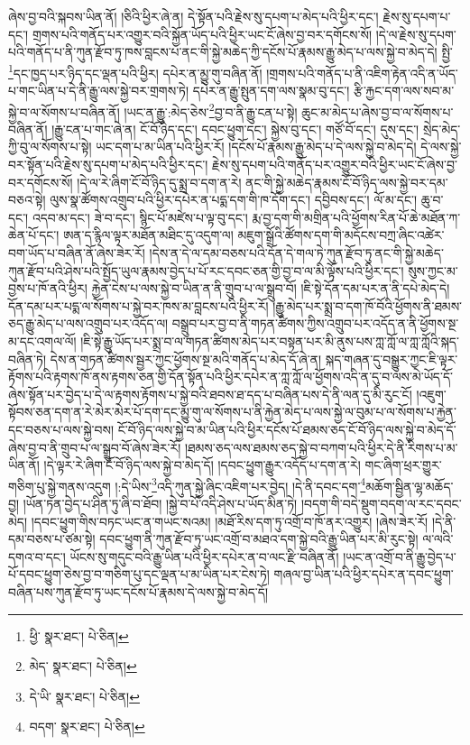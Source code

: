 ཞེས་བྱ་བའི་སྐབས་ཡིན་ནོ། །ཅིའི་ཕྱིར་ཞེ་ན། དེ་སྟོན་པའི་རྗེས་སུ་དཔག་པ་མེད་པའི་ཕྱིར་དང་། རྗེས་སུ་དཔག་པ་དང་། གྲགས་པའི་གནོད་པར་འགྱུར་བའི་སྐྱོན་ཡོད་པའི་ཕྱིར་ཡང་ངོ་ཞེས་བྱ་བར་དགོངས་སོ། །དེ་ལ་རྗེས་སུ་དཔག་པའི་གནོད་པ་ནི་ཀུན་རྫོབ་ཏུ་ཁས་བླངས་པ་ནང་གི་སྐྱེ་མཆེད་ཀྱི་དངོས་པོ་རྣམས་རྒྱུ་མེད་པ་ལས་སྐྱེ་བ་མེད་དེ། སྤྱི་\footnote{ཕྱི་  སྣར་ཐང་།  པེ་ཅིན། }དང་ཁྱད་པར་ཉིད་དང་ལྡན་པའི་ཕྱིར། དཔེར་ན་མྱུ་གུ་བཞིན་ནོ། །གྲགས་པའི་གནོད་པ་ནི་འཇིག་རྟེན་འདི་ན་ཡོད་པ་གང་ཡིན་པ་དེ་ནི་རྒྱུ་ལས་སྐྱེ་བར་གྲགས་ཏེ། དཔེར་ན་རྒྱུ་སྤུན་དག་ལས་སྣམ་བུ་དང་། རྩི་རྐྱང་དག་ལས་སབ་མ་སྐྱེ་བ་ལ་སོགས་པ་བཞིན་ནོ། །ཡང་ན་རྒྱུ་:མེད་ཅེས་\footnote{མེད་  སྣར་ཐང་།  པེ་ཅིན། }བྱ་བ་ནི་རྒྱུ་ངན་པ་སྟེ། ཆུང་མ་མེད་པ་ཞེས་བྱ་བ་ལ་སོགས་པ་བཞིན་ནོ། །རྒྱུ་ངན་པ་གང་ཞེ་ན། ངོ་བོ་ཉིད་དང་། དབང་ཕྱུག་དང་། སྐྱེས་བུ་དང་། གཙོ་བོ་དང་། དུས་དང་། སྲེད་མེད་ཀྱི་བུ་ལ་སོགས་པ་སྟེ། ཡང་དག་པ་མ་ཡིན་པའི་ཕྱིར་རོ། །དངོས་པོ་རྣམས་རྒྱུ་མེད་པ་དེ་ལས་སྐྱེ་བ་མེད་དེ། དེ་ལས་སྐྱེ་བར་སྟོན་པའི་རྗེས་སུ་དཔག་པ་མེད་པའི་ཕྱིར་དང་། རྗེས་སུ་དཔག་པའི་གནོད་པར་འགྱུར་བའི་ཕྱིར་ཡང་ངོ་ཞེས་བྱ་བར་དགོངས་སོ། །དེ་ལ་རེ་ཞིག་ངོ་བོ་ཉིད་དུ་སྨྲ་བ་དག་ན་རེ། ནང་གི་སྐྱེ་མཆེད་རྣམས་ངོ་བོ་ཉིད་ལས་སྐྱེ་བར་དམ་བཅའ་སྟེ། ལུས་སྣ་ཚོགས་འགྲུབ་པའི་ཕྱིར་དཔེར་ན་པདྨ་དག་གི་ཁ་དོག་དང་། དབྱིབས་དང་། ལོ་མ་དང་། ཆུ་བ་དང་། འདབ་མ་དང་། ཟེ་བ་དང་། སྙིང་པོ་མཛེས་པ་ལྟ་བུ་དང་། རྨ་བྱ་དག་གི་མགྲིན་པའི་ཕྱོགས་རིན་པོ་ཆེ་མཐོན་ཀ་ཆེན་པོ་དང་། ཨན་ད་རྙིལ་ལྟར་མཐོན་མཐིང་དུ་འདུག་ལ། མཇུག་སྒྲོའི་ཚོགས་དག་གི་མདོངས་བཀྲ་ཞིང་འཚེར་བག་ཡོད་པ་བཞིན་ནོ་ཞེས་ཟེར་རོ། །དེས་ན་དེ་ལ་དམ་བཅས་པའི་དོན་དེ་གལ་ཏེ་ཀུན་རྫོབ་ཏུ་ནང་གི་སྐྱེ་མཆེད་ཀུན་རྫོབ་པའི་ཤེས་པའི་སྤྱོད་ཡུལ་རྣམས་བྱེད་པ་པོ་རང་དབང་ཅན་གྱི་བྱ་བ་ལ་མི་ལྟོས་པའི་ཕྱིར་དང་། སུས་ཀྱང་མ་བྱས་པ་ཁོ་ནའི་ཕྱིར། རྐྱེན་ངེས་པ་ལས་སྐྱེ་བ་ཡིན་ན་ནི་གྲུབ་པ་ལ་སྒྲུབ་བོ། །ཇི་སྟེ་དོན་དམ་པར་ན་ནི་དཔེ་མེད་དེ། དོན་དམ་པར་པདྨ་ལ་སོགས་པ་སྐྱེ་བར་ཁས་མ་བླངས་པའི་ཕྱིར་རོ། །རྒྱུ་མེད་པར་སྨྲ་བ་དག་ཁོ་བོའི་ཕྱོགས་ནི་ཐམས་ཅད་རྒྱུ་མེད་པ་ལས་འགྲུབ་པར་འདོད་ལ། བསྒྲུབ་པར་བྱ་བ་ནི་གཏན་ཚིགས་ཀྱིས་འགྲུབ་པར་འདོད་ན་ནི་ཕྱོགས་སྔ་མ་དང་འགལ་ལོ། །ཇི་སྟེ་རྒྱུ་ཡོད་པར་སྨྲ་བ་ལ་གཏན་ཚིགས་མེད་པར་བསྟན་པར་མི་ནུས་པས་ཀླ་ཀློ་ལ་ཀླ་ཀློའི་སྐད་བཞིན་ཏེ། དེས་ན་གཏན་ཚིགས་སྦྱར་ཀྱང་ཕྱོགས་སྔ་མའི་གནོད་པ་མེད་དོ་ཞེ་ན། སྐད་གཞན་དུ་བསྒྱུར་ཀྱང་ཇི་ལྟར་རྟོགས་པའི་རྟགས་ཁོ་ནས་རྟགས་ཅན་གྱི་དོན་སྟོན་པའི་ཕྱིར་དཔེར་ན་ཀླ་ཀློ་ལ་ཕྱོགས་འདི་ན་དུ་བ་ལས་མེ་ཡོད་དོ་ཞེས་སྟོན་པར་བྱེད་པ་དེ་ལ་རྟགས་རྟོགས་པ་སྐྱེ་བའི་ཐབས་ཐ་དད་པ་བཞིན་པས་དེ་ནི་ལན་དུ་མི་རུང་ངོ། །འཇུག་སྟོབས་ཅན་དག་ན་རེ་མེར་མེར་པོ་དག་དང་མྱུ་གུ་ལ་སོགས་པ་ནི་རྐྱེན་མེད་པ་ལས་སྐྱེ་ལ་བུམ་པ་ལ་སོགས་པ་རྐྱེན་དང་བཅས་པ་ལས་སྐྱེ་བས། ངོ་བོ་ཉིད་ལས་སྐྱེ་བ་མ་ཡིན་པའི་ཕྱིར་དངོས་པོ་ཐམས་ཅད་ངོ་བོ་ཉིད་ལས་སྐྱེ་བ་མེད་དོ་ཞེས་བྱ་བ་ནི་གྲུབ་པ་ལ་སྒྲུབ་བོ་ཞེས་ཟེར་རོ། །ཐམས་ཅད་ལས་ཐམས་ཅད་སྐྱེ་བ་བཀག་པའི་ཕྱིར་དེ་ནི་རིགས་པ་མ་ཡིན་ནོ། །དེ་ལྟར་རེ་ཞིག་ངོ་བོ་ཉིད་ལས་སྐྱེ་བ་མེད་དོ། །དབང་ཕྱུག་རྒྱུར་འདོད་པ་དག་ན་རེ། གང་ཞིག་ཕྲར་གྱུར་གཅིག་པུ་སྐྱེ་གནས་འདུག །:དེ་ཡིས་\footnote{དེ་ཡི་  སྣར་ཐང་།  པེ་ཅིན། }འདི་ཀུན་སྐྱེ་ཞིང་འཇིག་པར་བྱེད། །དེ་ནི་དབང་དག་\footnote{བདག་  སྣར་ཐང་།  པེ་ཅིན། }མཆོག་སྦྱིན་ལྷ་མཆོད་བྱ། །ཡོན་ཏན་བྱེད་པ་ཤིན་ཏུ་ཞི་བ་ཐོབ། །སྐྱེ་བ་པོ་འདི་ཤེས་པ་ཡོད་མིན་ཏེ། །བདག་གི་བདེ་སྡུག་བདག་ལ་རང་དབང་མེད། །དབང་ཕྱུག་གིས་བཏང་ཡང་ན་གཡང་སའམ། །མཐོ་རིས་དག་ཏུ་འགྲོ་བ་ཁོ་ནར་འགྱུར། །ཞེས་ཟེར་རོ། །དེ་ནི་དམ་བཅས་པ་ཙམ་སྟེ། དབང་ཕྱུག་ནི་ཀུན་རྫོབ་ཏུ་ཡང་འགྲོ་བ་མཐའ་དག་སྐྱེ་བའི་རྒྱུ་ཡིན་པར་མི་རུང་སྟེ། ལ་ལའི་དགའ་བ་དང་། ཡོངས་སུ་གདུང་བའི་རྒྱུ་ཡིན་པའི་ཕྱིར་དཔེར་ན་བ་ལང་རྫི་བཞིན་ནོ། །ཡང་ན་འགྲོ་བ་ནི་རྒྱུ་བྱེད་པ་པོ་དབང་ཕྱུག་ཅེས་བྱ་བ་གཅིག་པུ་དང་ལྡན་པ་མ་ཡིན་པར་ངེས་ཏེ། གཞལ་བྱ་ཡིན་པའི་ཕྱིར་དཔེར་ན་དབང་ཕྱུག་བཞིན་པས་ཀུན་རྫོབ་ཏུ་ཡང་དངོས་པོ་རྣམས་དེ་ལས་སྐྱེ་བ་མེད་དོ། 